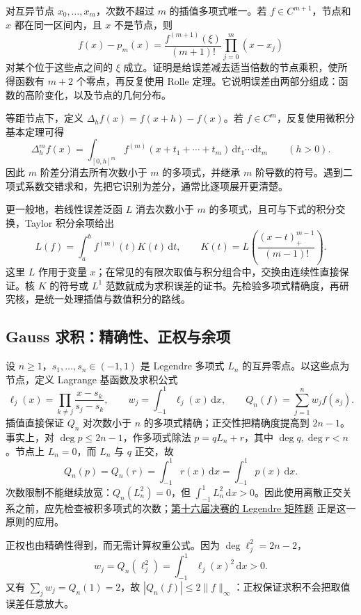 \documentclass[12pt,fontset=fandol]{ctexart}
\begin{document}
\label{app:estimate-interpolation}

对互异节点 $x_0,\ldots,x_m$，次数不超过 $m$ 的插值多项式唯一。若 $f\in C^{m+1}$，节点和 $x$ 都在同一区间内，且 $x$ 不是节点，则
\[
f(x)-p_m(x)=\frac{f^{(m+1)}(\xi)}{(m+1)!}\prod_{j=0}^m(x-x_j)
\]
对某个位于这些点之间的 $\xi$ 成立。证明是给误差减去适当倍数的节点乘积，使所得函数有 $m+2$ 个零点，再反复使用 Rolle 定理。它说明误差由两部分组成：函数的高阶变化，以及节点的几何分布。

等距节点下，定义 $\Delta_h f(x)=f(x+h)-f(x)$。若 $f\in C^m$，反复使用微积分基本定理可得
\[
\Delta_h^m f(x)=\int_{[0,h]^m}f^{(m)}(x+t_1+\cdots+t_m)\,\mathrm dt_1\cdots\mathrm dt_m
\qquad(h>0).
\]
因此 $m$ 阶差分消去所有次数小于 $m$ 的多项式，并继承 $m$ 阶导数的符号。遇到二项式系数交错求和，先把它识别为差分，通常比逐项展开更清楚。

更一般地，若线性误差泛函 $L$ 消去次数小于 $m$ 的多项式，且可与下式的积分交换，Taylor 积分余项给出
\[
L(f)=\int_a^b f^{(m)}(t)K(t)\,\mathrm dt,
\qquad K(t)=L\!\left(\frac{(x-t)_+^{m-1}}{(m-1)!}\right).
\]
这里 $L$ 作用于变量 $x$；在常见的有限次取值与积分组合中，交换由连续性直接保证。核 $K$ 的符号或 $L^1$ 范数就成为求积误差的证书。先检验多项式精确度，再研究核，是统一处理插值与数值积分的路线。

\subsection{Gauss 求积：精确性、正权与余项}

\label{app:estimate-gauss}

设 $n\ge1$，$s_1,\ldots,s_n\in(-1,1)$ 是 Legendre 多项式 $L_n$ 的互异零点。以这些点为节点，定义 Lagrange 基函数及求积公式
\[
\ell_j(x)=\prod_{k\ne j}\frac{x-s_k}{s_j-s_k},\qquad
w_j=\int_{-1}^1\ell_j(x)\,\mathrm dx,\qquad
Q_n(f)=\sum_{j=1}^nw_jf(s_j).
\]
插值直接保证 $Q_n$ 对次数小于 $n$ 的多项式精确；正交性把精确度提高到 $2n-1$。事实上，对 $\deg p\le2n-1$，作多项式除法 $p=qL_n+r$，其中 $\deg q,\deg r<n$。节点上 $L_n=0$，而 $L_n$ 与 $q$ 正交，故
\[
Q_n(p)=Q_n(r)=\int_{-1}^1r(x)\,\mathrm dx
=\int_{-1}^1p(x)\,\mathrm dx.
\]
次数限制不能继续放宽：$Q_n(L_n^2)=0$，但 $\int_{-1}^1L_n^2\,\mathrm dx>0$。因此使用离散正交关系之前，应先检查被积多项式的次数；\hyperref[pr:fin16-high:13]{第十六届决赛的 Legendre 矩阵题} 正是这一原则的应用。

正权也由精确性得到，而无需计算权重公式。因为 $\deg\ell_j^2=2n-2$，
\[
w_j=Q_n(\ell_j^2)=\int_{-1}^1\ell_j(x)^2\,\mathrm dx>0.
\]
又有 $\sum_jw_j=Q_n(1)=2$，故 $|Q_n(f)|\le2\|f\|_\infty$：正权保证求积不会把取值误差任意放大。
\end{document}
